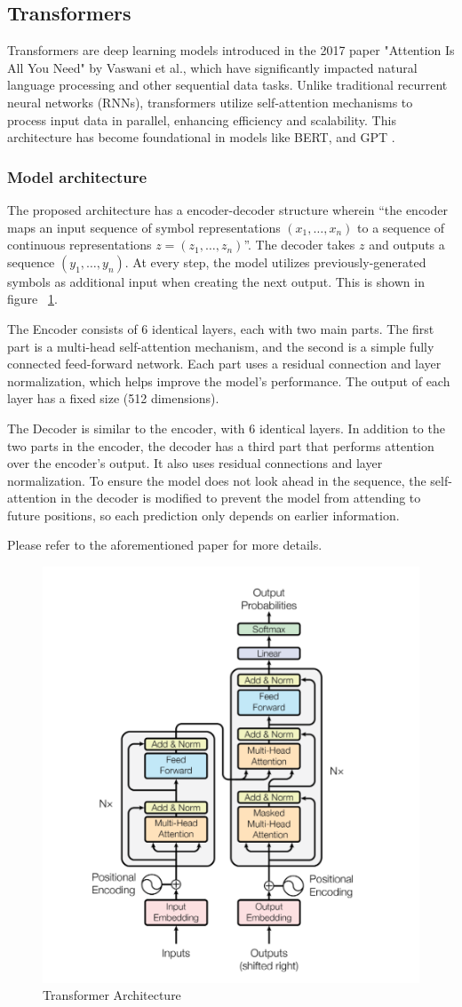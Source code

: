 \documentclass[licencjacka,en]{pracamgr}
\begin{document}
\subsection{Transformers}
Transformers are deep learning models introduced in the 2017 paper "Attention Is All You Need" by Vaswani et al., which have significantly impacted natural language processing and other sequential data tasks. Unlike traditional recurrent neural networks (RNNs), transformers utilize self-attention mechanisms to process input data in parallel, enhancing efficiency and scalability. This architecture has become foundational in models like BERT, and GPT \cite{medium_t}.
\subsubsection{Model architecture}
The proposed architecture has a encoder-decoder structure wherein “the encoder maps an input sequence of symbol representations $ (x_1, … , x_n) $ to a sequence of continuous representations $ z = (z_1, … , z_n) $”. The decoder takes $ z $ and outputs a sequence $ (y_1, … , y_n) $. At every step, the model utilizes previously-generated symbols as additional input when creating the next output. This is shown in figure ~\ref{fig:transformers_fig}. 

The Encoder consists of 6 identical layers, each with two main parts. The first part is a multi-head self-attention mechanism, and the second is a simple fully connected feed-forward network. Each part uses a residual connection and layer normalization, which helps improve the model's performance. The output of each layer has a fixed size (512 dimensions).

The Decoder is similar to the encoder, with 6 identical layers. In addition to the two parts in the encoder, the decoder has a third part that performs attention over the encoder’s output. It also uses residual connections and layer normalization. To ensure the model does not look ahead in the sequence, the self-attention in the decoder is modified to prevent the model from attending to future positions, so each prediction only depends on earlier information.

Please refer to the aforementioned paper for more details.

\begin{figure}
    \centering
    \includegraphics[width=0.5\linewidth]{bachelor_images/transformer_arch.png}
    \caption{Transformer Architecture \cite{attention}}
    \label{fig:transformers_fig}
\end{figure}
\end{document}
